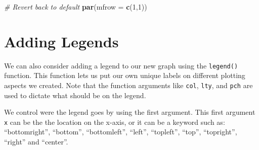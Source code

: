 \documentclass[
]{book}
\newenvironment{Shaded}{\begin{snugshade}}{\end{snugshade}}
\newcommand{\CommentTok}[1]{\textcolor[rgb]{0.56,0.35,0.01}{\textit{#1}}}
\newcommand{\DataTypeTok}[1]{\textcolor[rgb]{0.13,0.29,0.53}{#1}}
\newcommand{\DecValTok}[1]{\textcolor[rgb]{0.00,0.00,0.81}{#1}}
\newcommand{\KeywordTok}[1]{\textcolor[rgb]{0.13,0.29,0.53}{\textbf{#1}}}
\newcommand{\NormalTok}[1]{#1}
\newcommand{\OperatorTok}[1]{\textcolor[rgb]{0.81,0.36,0.00}{\textbf{#1}}}
\newcommand{\StringTok}[1]{\textcolor[rgb]{0.31,0.60,0.02}{#1}}
\begin{document}
\begin{Shaded}
\begin{Highlighting}[]
\CommentTok{# Revert back to default }
\KeywordTok{par}\NormalTok{(}\DataTypeTok{mfrow =} \KeywordTok{c}\NormalTok{(}\DecValTok{1}\NormalTok{,}\DecValTok{1}\NormalTok{))}
\end{Highlighting}
\end{Shaded}

\hypertarget{adding-legends}{%
\section{Adding Legends}\label{adding-legends}}

We can also consider adding a legend to our new graph using the \texttt{legend()} function. This function lets us put our own unique labels on different plotting aspects we created. Note that the function arguments like \texttt{col}, \texttt{lty}, and \texttt{pch} are used to dictate what should be on the legend.

We control were the legend goes by using the first argument. This first argument \texttt{x} can be the the location on the x-axis, or it can be a keyword such as: ``bottomright'', ``bottom'', ``bottomleft'', ``left'', ``topleft'', ``top'', ``topright'', ``right'' and ``center''.

\begin{Shaded}
\end{Shaded}
\end{document}
